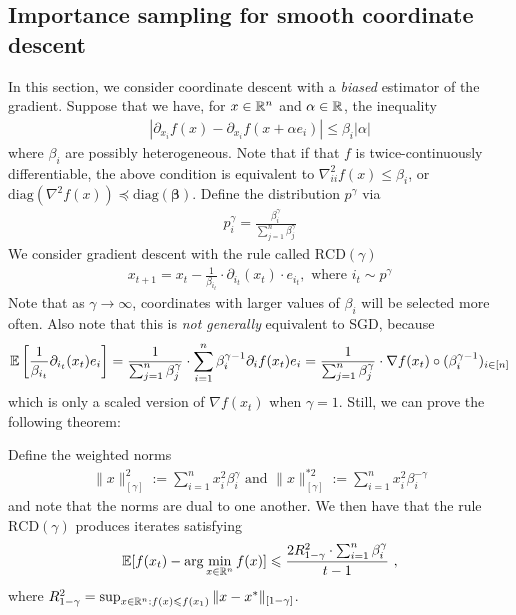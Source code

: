 	\subsection{Importance sampling for smooth coordinate descent}
	In this section, we consider coordinate descent with a \emph{biased}
  estimator of the gradient. Suppose that we have, for $x \in \mathbb{R}^n$
  and $\alpha \in \mathbb{R}$, the inequality
	\begin{eqnarray}
    |\partial_{x_i} f(x) - \partial_{x_i} f(x + \alpha e_i)|
    \le \beta_{i}|\alpha|
	\end{eqnarray}
	where $\beta_i$ are possibly heterogeneous. Note that if that $f$ is
twice-continuously differentiable, the above condition is equivalent to
$\nabla^2_{ii}f(x) \le \beta_i$, or $\mathrm{diag}(\nabla^2 f(x)) \preceq \mathrm{diag}(\boldsymbol{\beta})$.  Define the distribution $p^\gamma$ via
	\begin{eqnarray}
	p^{\gamma}_i = \frac{\beta_i^{\gamma}}{\sum_{j=1}^n \beta_j^{\gamma}}
	\end{eqnarray}
	We consider gradient descent with the rule called $\mathrm{RCD}(\gamma)$
	\begin{eqnarray}\label{RCDgamma}
    x_{t+1} = x_t - \frac{1}{\beta_{i_t}} \cdot \partial_{i_t}(x_t) \cdot e_{i_t}, \text{ where } i_t \sim p^{\gamma}
	\end{eqnarray}
  Note that as $\gamma \to \infty$, coordinates with larger values of $\beta_i$
  will be selected more often.
	Also note that this is \emph{not generally} equivalent to SGD, because 
	\begin{eqnarray}
    \operatorname*{\mathbb{E}}\left[\frac{1}{\beta_{i_t}}\partial_{i_t}(x_t)e_i\right]
    = \frac{1}{\sum_{j=1}^n \beta_j^{\gamma}} \cdot \sum_{i=1}^n \beta_{i}^{\gamma - 1} \partial_i f(x_t)e_i
    = \frac{1}{\sum_{j=1}^n \beta_j^{\gamma}} \cdot \nabla f(x_t) \circ (\beta_i^{\gamma - 1})_{i \in [n]}
	\end{eqnarray}
	which is only a scaled version of $\nabla f(x_t)$ when $\gamma = 1$. Still, we can prove the following theorem:
	\begin{theorem}
  \label{thm:6.7}
  Define the weighted norms
	\begin{eqnarray}
	\|x\|_{[\gamma]}^2 := \sum_{i=1}^n x_i^2 \beta_i^\gamma \text{ and } \|x\|_{[\gamma]}^{*2} := \sum_{i=1}^n x_i^2 \beta_i^{-\gamma}
	\end{eqnarray}
	and note that the norms are dual to one another.
  We then have that the rule $\mathrm{RCD}(\gamma)$ produces iterates satisfying
	\begin{eqnarray}
	  \operatorname*{\mathbb{E}}[f(x_t) - \arg\min_{x \in \mathbb{R}^{n}} f(x)]
    \leqslant \frac{2 R^2_{1-\gamma} \cdot \sum_{i=1}^n \beta_{i}^{\gamma}}{t-1}~,
	\end{eqnarray}
	where $R^2_{1-\gamma} = \sup_{x \in \mathbb{R}^n:f(x) \leqslant f(x_1)} \|x - x^*\|_{[1 - \gamma]}$.
	\end{theorem}
